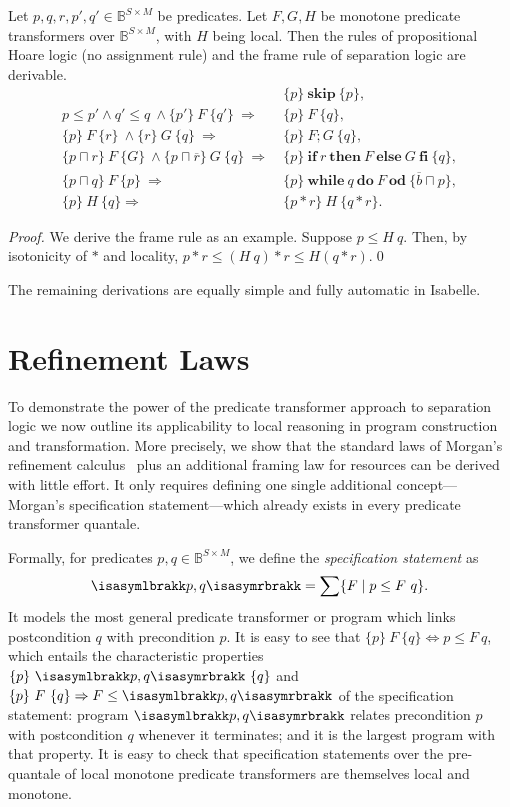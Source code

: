 \documentclass[twoside,runningheads,envcountsame,envcountsect,oribibl,orivec]{llncs}
\newcommand{\sskip}{\mathbf{skip}}
\newcommand{\iif}{\mathbf{if}}
\newcommand{\tthen}{\mathbf{then}}
\newcommand{\eelse}{\mathbf{else}}
\newcommand{\ffi}{\mathbf{fi}}
\newcommand{\wwhile}{\mathbf{while}}
\newcommand{\ddo}{\mathbf{do}}
\newcommand{\ood}{\mathbf{od}}
\newcommand{\triple}[3]{\{#1\}\ #2\ \{#3\}}
\newcommand{\ifstat}[3] {\iif \ #1 \ \tthen \ #2 \ \eelse \ #3 \ \ffi}
\newcommand{\whileloop}[2] {\wwhile \ #1 \ \ddo \ #2 \ \ood}
\newcommand{\spec}[2]{{\isasymlbrakk}#1, #2{\isasymrbrakk}}
\begin{document}
\begin{proposition}
  Let $p,q,r,p',q'\in \mathbb{B}^{S\times M}$ be predicates. Let
  $F,G,H$ be monotone predicate transformers over $\mathbb{B}^{S\times
    M}$, with $H$ being local.  Then the rules of propositional
  Hoare logic (no assignment rule) and the frame rule of
  separation logic are derivable.
\begin{align*}
	& \triple{p}{\sskip}{p}, \\
	p \le p' \wedge  q' \le q\ \wedge \triple{p'}{F}{q'} \ \Rightarrow\ &
		\triple{p}{F}{q}, \\
	\triple{p}{F}{r}\ \wedge \triple{r}{G}{q}\ \Rightarrow\ &
		\triple{p}{F; G}{q}, \\
	\triple{p \sqcap r}{F}{G}\ \wedge \triple{p \sqcap \overline{r}}{G}{q}\ \Rightarrow\ &
		\triple{p}{\ifstat{r}{F}{G}}{q}, \\
	\triple{p \sqcap q}{F}{p}\ \Rightarrow\ & \triple{p}{\whileloop{q}{F}}{\overline{b} \sqcap p}, \\
	\triple{p}{H}{q} \Rightarrow\ & \triple{p \ast r}{H}{q \ast r}.
\end{align*}
\end{proposition}
\begin{proof} 
  We derive the frame rule as an example. Suppose $p \le H\ q$. Then,
  by isotonicity of $\ast$ and locality,
$p\ast r\le (H\ q) \ast r \le H (q \ast r)$.\qed
\end{proof}
The remaining derivations are equally simple and fully automatic in
Isabelle.



\section{Refinement Laws}\label{sec:refinement}

To demonstrate the power of the predicate transformer approach to
separation logic we now outline its applicability to local reasoning
in program construction and transformation. More precisely, we show
that the standard laws of Morgan's refinement calculus~\cite{Mor98}
plus an additional framing law for resources can be derived with
little effort.  It only requires defining one single additional
concept---Morgan's specification statement---which already exists in
every predicate transformer quantale.

 Formally, for predicates $p,q\in\mathbb{B}^{S\times M}$, we define
 the \emph{specification statement} as
\begin{equation*}
  \spec{p}{q} = \sum \{F \mid p\le F\ q\}.
\end{equation*}
It models the most general predicate transformer or program which
links postcondition $q$ with precondition $p$. It is easy to see that
$\triple{p}{F}{q}\Leftrightarrow p \le F\ q$, which entails the
characteristic properties $\triple{p}{\spec{p}{q}}{q}$ and
$\triple{p}{F}{q} \Rightarrow F \le \spec{p}{q}$ of the specification
statement: program $\spec{p}{q}$ relates precondition $p$ with
postcondition $q$ whenever it terminates; and it is the largest
program with that property. It is easy to check that specification
statements over the pre-quantale of local monotone predicate
transformers are themselves local and monotone.
\end{document}
